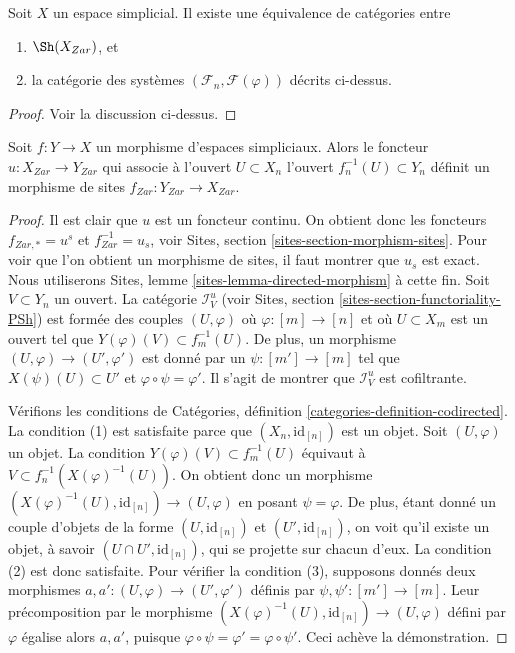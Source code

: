 \begin{lemma}
\label{lemma-describe-sheaves-simplicial-site}
Soit $X$ un espace simplicial. Il existe une équivalence de
catégories entre
\begin{enumerate}
\item $\Sh(X_{Zar})$, et
\item la catégorie des systèmes $(\mathcal{F}_n, \mathcal{F}(\varphi))$
décrits ci-dessus.
\end{enumerate}
\end{lemma}

\begin{proof}
Voir la discussion ci-dessus.
\end{proof}

\begin{lemma}
\label{lemma-simplicial-space-site-functorial}
Soit $f : Y \to X$ un morphisme d'espaces simpliciaux.
Alors le foncteur $u : X_{Zar} \to Y_{Zar}$
qui associe à l'ouvert $U \subset X_n$ l'ouvert
$f_n^{-1}(U) \subset Y_n$ définit un morphisme de sites
$f_{Zar} : Y_{Zar} \to X_{Zar}$.
\end{lemma}

\begin{proof}
Il est clair que $u$ est un foncteur continu. On obtient donc les foncteurs
$f_{Zar, *} = u^s$ et $f_{Zar}^{-1} = u_s$, voir
Sites, section \ref{sites-section-morphism-sites}.
Pour voir que l'on obtient un morphisme de sites, il faut montrer
que $u_s$ est exact. Nous utiliserons
Sites, lemme \ref{sites-lemma-directed-morphism} à cette fin.
Soit $V \subset Y_n$ un ouvert. La catégorie
$\mathcal{I}_V^u$ (voir Sites, section \ref{sites-section-functoriality-PSh})
est formée des couples $(U, \varphi)$ où
$\varphi : [m] \to [n]$ et où $U \subset X_m$ est un ouvert tel que
$Y(\varphi)(V) \subset f_m^{-1}(U)$. De plus, un morphisme
$(U, \varphi) \to (U', \varphi')$ est donné par un
$\psi : [m'] \to [m]$ tel que $X(\psi)(U) \subset U'$
et $\varphi \circ \psi = \varphi'$.
Il s'agit de montrer que $\mathcal{I}_V^u$ est cofiltrante.

\medskip\noindent
Vérifions les conditions de
Catégories, définition \ref{categories-definition-codirected}.
La condition (1) est satisfaite parce que $(X_n, \text{id}_{[n]})$ est un objet.
Soit $(U, \varphi)$ un objet. La condition
$Y(\varphi)(V) \subset f_m^{-1}(U)$ équivaut à
$V \subset f_n^{-1}(X(\varphi)^{-1}(U))$. On obtient donc un morphisme
$(X(\varphi)^{-1}(U), \text{id}_{[n]}) \to (U, \varphi)$ en posant
$\psi = \varphi$. De plus, étant donné un couple d'objets
de la forme $(U, \text{id}_{[n]})$ et $(U', \text{id}_{[n]})$,
on voit qu'il existe un objet, à savoir $(U \cap U', \text{id}_{[n]})$,
qui se projette sur chacun d'eux. La condition (2) est donc satisfaite.
Pour vérifier la condition (3), supposons donnés deux morphismes
$a, a': (U, \varphi) \to (U', \varphi')$ définis par $\psi, \psi' : [m'] \to [m]$.
Leur précomposition par le morphisme
$(X(\varphi)^{-1}(U), \text{id}_{[n]}) \to (U, \varphi)$ défini
par $\varphi$ égalise alors $a, a'$, puisque
$\varphi \circ \psi = \varphi' = \varphi \circ \psi'$.
Ceci achève la démonstration.
\end{proof}

